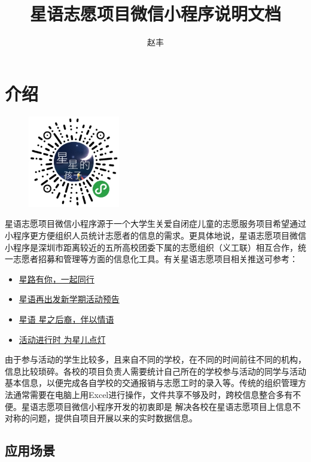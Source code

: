 \documentclass[]{ctexart}
\title{星语志愿项目微信小程序说明文档}
\author{赵丰}
\begin{document}
\maketitle
\tableofcontents
\section{介绍}\label{ux4ecbux7ecd}
\begin{figure}
\centering
\includegraphics[width=4cm]{qr_code.jpg}
\end{figure}
星语志愿项目微信小程序源于一个大学生关爱自闭症儿童的志愿服务项目希望通过小程序更方便组织人员统计志愿者的信息的需求。更具体地说，星语志愿项目微信小程序是深圳市距离较近的五所高校团委下属的志愿组织（义工联）相互合作，统一志愿者招募和管理等方面的信息化工具。有关星语志愿项目相关推送可参考：

\begin{itemize}
\item
  \href{https://mp.weixin.qq.com/s/byIknsUz62tn1YJlp10byQ}{星路有你，一起同行}
\item
  \href{https://mp.weixin.qq.com/s/hSAWZha7Tkq2MzG_uOD06Q}{星语再出发\textbar{}新学期活动预告}
\item
  \href{https://mp.weixin.qq.com/s/VM50R464I1mo3E6GOoEZew}{星语
  \textbar{} 星之后裔，伴以情语}
\item
  \href{https://mp.weixin.qq.com/s/RyINo_CrGJZAUaHekhHcPg}{活动进行时
  \textbar{} 为星儿点灯}
\end{itemize}

由于参与活动的学生比较多，且来自不同的学校，在不同的时间前往不同的机构，信息比较琐碎。各校的项目负责人需要统计自己所在的学校参与活动的同学与活动基本信息，以便完成各自学校的交通报销与志愿工时的录入等。传统的组织管理方法通常需要在电脑上用Excel进行操作，文件共享不够及时，跨校信息整合多有不便。星语志愿项目微信小程序开发的初衷即是
解决各校在星语志愿项目上信息不对称的问题，提供自项目开展以来的实时数据信息。

\subsection{应用场景}\label{ux5e94ux7528ux573aux666f}
\end{document}
